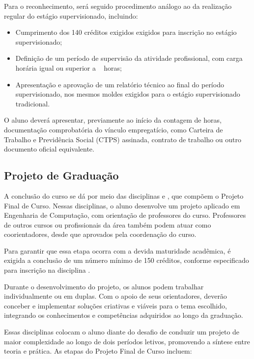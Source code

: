 Para o reconhecimento, será seguido procedimento análogo ao da realização regular do estágio supervisionado, incluindo:

\begin{itemize}
    \item Cumprimento dos 140 créditos exigidos exigidos para inscrição no estágio supervisionado;
    \item Definição de um período de supervisão da atividade profissional, com carga horária igual ou superior a \EstSupCH~ horas;
    \item Apresentação e aprovação de um relatório técnico ao final do período supervisionado, nos mesmos moldes exigidos para o estágio supervisionado tradicional. \end{itemize}

O aluno deverá apresentar, previamente ao início da contagem de horas, documentação comprobatória do vínculo empregatício, como Carteira de Trabalho e Previdência Social (CTPS) assinada, contrato de trabalho ou outro documento oficial equivalente.



\subsection{Projeto de Graduação}

A conclusão do curso se dá por meio das disciplinas \textbf{\ProjA} e \textbf{\ProjB}, que compõem o Projeto Final de Curso. Nessas disciplinas, o aluno desenvolve um projeto aplicado em Engenharia de Computação, com orientação de professores do curso. Professores de outros cursos ou profissionais da área também podem atuar como coorientadores, desde que aprovados pela coordenação do curso.

Para garantir que essa etapa ocorra com a devida maturidade acadêmica, é exigida a conclusão de um número mínimo de 150 créditos, conforme especificado para inscrição na disciplina \textbf{\ProjA}.

Durante o desenvolvimento do projeto, os alunos podem trabalhar individualmente ou em duplas. Com o apoio de seus orientadores, deverão conceber e implementar soluções criativas e viáveis para o tema escolhido, integrando os conhecimentos e competências adquiridos ao longo da graduação.

Essas disciplinas colocam o aluno diante do desafio de conduzir um projeto de maior complexidade ao longo de dois períodos letivos, promovendo a síntese entre teoria e prática. As etapas do Projeto Final de Curso incluem:

